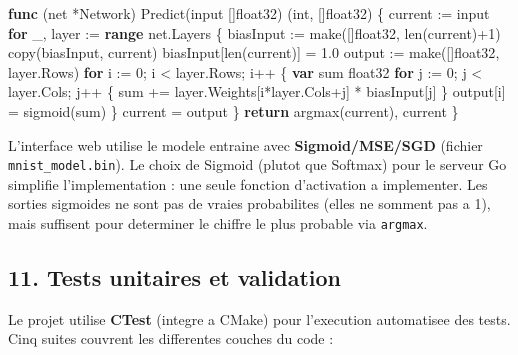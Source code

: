 \documentclass[
  letterpaper,
  DIV=11,
  numbers=noendperiod]{scrartcl}
\newenvironment{Shaded}{\begin{snugshade}}{\end{snugshade}}
\newcommand{\BuiltInTok}[1]{\textcolor[rgb]{0.00,0.23,0.31}{#1}}
\newcommand{\ControlFlowTok}[1]{\textcolor[rgb]{0.00,0.23,0.31}{\textbf{#1}}}
\newcommand{\DataTypeTok}[1]{\textcolor[rgb]{0.68,0.00,0.00}{#1}}
\newcommand{\DecValTok}[1]{\textcolor[rgb]{0.68,0.00,0.00}{#1}}
\newcommand{\FloatTok}[1]{\textcolor[rgb]{0.68,0.00,0.00}{#1}}
\newcommand{\FunctionTok}[1]{\textcolor[rgb]{0.28,0.35,0.67}{#1}}
\newcommand{\KeywordTok}[1]{\textcolor[rgb]{0.00,0.23,0.31}{\textbf{#1}}}
\newcommand{\NormalTok}[1]{\textcolor[rgb]{0.00,0.23,0.31}{#1}}
\begin{document}
\begin{Shaded}
\begin{Highlighting}[]
\KeywordTok{func}\NormalTok{ (net *Network) }\FunctionTok{Predict}\NormalTok{(input []}\DataTypeTok{float32}\NormalTok{) (}\DataTypeTok{int}\NormalTok{, []}\DataTypeTok{float32}\NormalTok{) \{}
\NormalTok{    current := input}
    \ControlFlowTok{for}\NormalTok{ \_, layer := }\ControlFlowTok{range}\NormalTok{ net.Layers \{}
\NormalTok{        biasInput := }\BuiltInTok{make}\NormalTok{([]}\DataTypeTok{float32}\NormalTok{, }\BuiltInTok{len}\NormalTok{(current)+1)}
        \BuiltInTok{copy}\NormalTok{(biasInput, current)}
\NormalTok{        biasInput[}\BuiltInTok{len}\NormalTok{(current)] = }\FloatTok{1.0}
\NormalTok{        output := }\BuiltInTok{make}\NormalTok{([]}\DataTypeTok{float32}\NormalTok{, layer.Rows)}
        \ControlFlowTok{for}\NormalTok{ i := }\DecValTok{0}\NormalTok{; i < layer.Rows; i++ \{}
            \KeywordTok{var}\NormalTok{ sum }\DataTypeTok{float32}
            \ControlFlowTok{for}\NormalTok{ j := }\DecValTok{0}\NormalTok{; j < layer.Cols; j++ \{}
\NormalTok{                sum += layer.Weights[i*layer.Cols+j] * biasInput[j]}
\NormalTok{            \}}
\NormalTok{            output[i] = }\FunctionTok{sigmoid}\NormalTok{(sum)}
\NormalTok{        \}}
\NormalTok{        current = output}
\NormalTok{    \}}
    \ControlFlowTok{return} \FunctionTok{argmax}\NormalTok{(current), current}
\NormalTok{\}}
\end{Highlighting}
\end{Shaded}

L'interface web utilise le modele entraine avec \textbf{Sigmoid/MSE/SGD} (fichier \texttt{mnist\_model.bin}). Le choix de Sigmoid (plutot que Softmax) pour le serveur Go simplifie l'implementation : une seule fonction d'activation a implementer. Les sorties sigmoides ne sont pas de vraies probabilites (elles ne somment pas a 1), mais suffisent pour determiner le chiffre le plus probable via \texttt{argmax}.


\subsection{11. Tests unitaires et validation}\label{tests}

Le projet utilise \textbf{CTest} (integre a CMake) pour l'execution automatisee des tests. Cinq suites couvrent les differentes couches du code :
\end{document}
